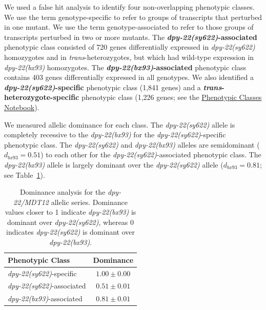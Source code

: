 \documentclass[8pt, twocolumn]{article}
\newcommand{\gene}[1]{\mbox{\emph{#1}}}
\newcommand{\dpy}[1]{\gene{dpy-22#1}}
\newcommand{\bx}{\dpy{(bx93)}}
\newcommand{\sy}{\dpy{(sy622)}}
\begin{document}
We used a false hit analysis to identify four non-overlapping phenotypic
classes. We use the term genotype-specific to refer to groups of transcripts
that perturbed in one mutant. We use the term genotype-associated to refer to
those groups of transcripts  perturbed in two or more mutants. The
\textbf{\sy{}-associated} phenotypic class consisted of 720 genes differentially
expressed in \sy{} homozygotes and in \emph{trans}-heterozygotes, but which had
wild-type expression in \bx{} homozygotes. The \textbf{\bx{}-associated}
phenotypic class contains 403 genes differentially expressed in all genotypes.
We also identified a \textbf{\sy{}-specific} phenotypic class (1,841 genes) and
a \textbf{\emph{trans}-heterozygote-specific} phenotypic class (1,226 genes; see
the
\href{https://wormlabcaltech.github.io/med-cafe/notebook/phenotypic_classes.html}{
Phenotypic Classes Notebook}). 

We measured allelic dominance for each class. The \sy{} allele is completely
recessive to the \bx{} for the \sy{}-specific phenotypic class. The \sy{} and
\bx{} alleles are semidominant ($d_{bx93} = 0.51$) to each other for the
\sy{}-associated phenotypic class. The \bx{} allele is largely  dominant over
the \sy{} allele ($d_{bx93}=0.81$; see Table~\ref{tab:dom}).

\begin{table}
  \centering
  \begin{tabular}{lc}
    \toprule
    Phenotypic Class & Dominance\\
    \midrule
    \sy{}-specific & $1.00\pm0.00$\\
    \sy{}-associated & $0.51\pm0.01$\\
    \bx{}-associated & $0.81\pm0.01$\\
    \bottomrule
  \end{tabular}
  \caption{Dominance analysis for the \dpy{/MDT12} allelic series. Dominance
  values closer to 1 indicate \bx{} is dominant over \sy{}, whereas 0 indicates
  \sy{} is dominant over \bx{}.}
\label{tab:dom}

\end{table}
\end{document}
